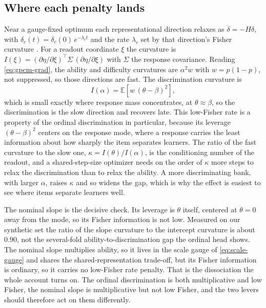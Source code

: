 \documentclass[sigconf,nonacm,screen]{acmart}
\newcommand{\E}{\mathbb{E}}
\begin{document}
\subsection{Where each penalty lands}
Near a gauge-fixed optimum each representational direction relaxes as
$\dot\delta=-H\delta$, with $\delta_c(t)=\delta_c(0)\,e^{-\lambda_c t}$ and the rate
$\lambda_c$ set by that direction's Fisher curvature
\cite{saxe_exact_2014,amari_natural_1998}. For a readout coordinate $\xi$ the
curvature is $I(\xi)=(\partial\eta/\partial\xi)^\top\Sigma\,(\partial\eta/\partial\xi)$
with $\Sigma$ the response covariance. Reading \eqref{eq:gpcm-grad}, the ability and
difficulty curvatures are $\alpha^2 w$ with $w=p(1-p)$, not suppressed, so those
directions are fast. The discrimination curvature is
\begin{equation}
I(\alpha)=\E\!\left[w\,(\theta-\beta)^2\right],
\label{eq:fisher-alpha}
\end{equation}
which is small exactly where response mass concentrates, at $\theta\approx\beta$, so
the discrimination is the slow direction and recovers late. This low-Fisher rate is
a property of the ordinal discrimination in particular, because its leverage
$(\theta-\beta)^2$ centers on the response mode, where a response carries the least
information about how sharply the item separates learners. The ratio of the fast
curvature to the slow one, $\kappa=I(\theta)/I(\alpha)$, is the conditioning number
of the readout, and a shared-step-size optimizer needs on the order of $\kappa$ more
steps to relax the discrimination than to relax the ability. A more discriminating
bank, with larger $\alpha$, raises $\kappa$ and so widens the gap, which is why the
effect is easiest to see where items separate learners well.

The nominal slope is the decisive check. Its leverage is $\theta$ itself, centered
at $\theta=0$ away from the mode, so its Fisher information is not low. Measured on
our synthetic set the ratio of the slope curvature to the intercept curvature is
about $0.90$, not the several-fold ability-to-discrimination gap the ordinal head
shows. The nominal slope multiplies ability, so it lives in the scale gauge of
\eqref{eq:scale-gauge} and shares the shared-representation trade-off, but its
Fisher information is ordinary, so it carries no low-Fisher rate penalty. That is
the dissociation the whole account turns on. The ordinal discrimination is both
multiplicative and low Fisher, the nominal slope is multiplicative but not low
Fisher, and the two levers should therefore act on them differently.
\end{document}
